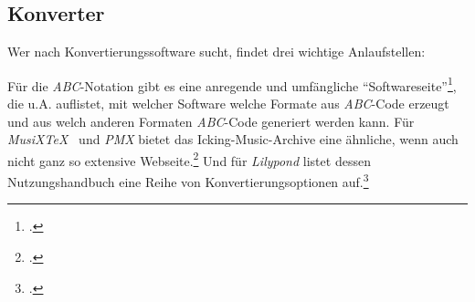 %
%
%



\subsection{Konverter}

Wer nach Konvertierungssoftware sucht, findet drei wichtige Anlaufstellen:

Für die \textit{ABC}-Notation gibt es eine anregende und umfängliche
\enquote{Softwareseite}\footcite[vgl.][\nopage wp]{Abc2018b}, die u.A.
auflistet, mit welcher Software welche Formate aus \textit{ABC}-Code erzeugt und
aus welch anderen Formaten \textit{ABC}-Code generiert werden kann. Für
\textit{MusiX\TeX\ } und \textit{PMX} bietet das Icking-Music-Archive eine
ähnliche, wenn auch nicht ganz so extensive Webseite.\footcite[vgl.][\nopage
wp]{Tennent2018b} Und für \textit{Lilypond} listet dessen Nutzungshandbuch eine Reihe von
Konvertierungsoptionen auf.\footcite[vgl.][42ff]{LilyPond2018e}

